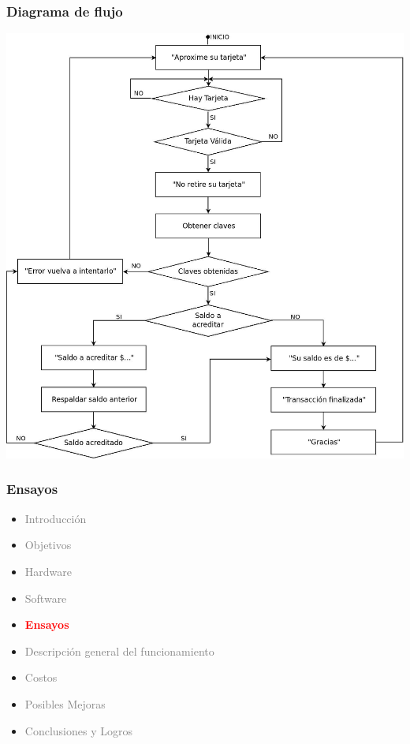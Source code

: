 \documentclass{beamer}
\begin{document}
\begin{frame}
	\frametitle{Diagrama de flujo}
	\begin{center}
		\includegraphics[scale=.166]{Imagenes/flujo.jpg}
	\end{center}
\end{frame}	

\begin{frame}
	\frametitle{Ensayos}
	\begin{itemize}
		\item \textcolor{gray}{Introducción}
		\item \textcolor{gray}{Objetivos}
		\item \textcolor{gray}{Hardware}
		\item \textcolor{gray}{Software}
		\item \textcolor{red}{\bf{Ensayos}}
		\item \textcolor{gray}{Descripción general del funcionamiento}		
		\item \textcolor{gray}{Costos}
		\item \textcolor{gray}{Posibles Mejoras}
		\item \textcolor{gray}{Conclusiones y Logros}
	\end{itemize}
\end{frame}
\end{document}
